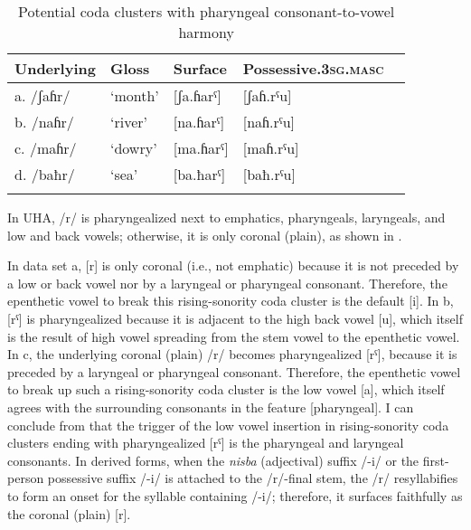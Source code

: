 \documentclass[output=paper,colorlinks,citecolor=brown]{langscibook}
\begin{document}
\begin{table}
\caption{Potential coda clusters with pharyngeal consonant-to-vowel harmony}
\label{potC}
\begin{tabular}{lllll}
\lsptoprule
Underlying & Gloss & Surface & Possessive.3\textsc{sg}.\textsc{masc} \\\midrule 
a. /ʃaɦr/   &   ‘month’ &   [ʃa.ɦarˤ]   &   [ʃaɦ.rˤu] \\
b. /naɦr/   &   ‘river’ &   [na.ɦarˤ]   &   [naɦ.rˤu] \\
c. /maɦr/   &   ‘dowry’ &   [ma.ɦarˤ]   &   [maɦ.rˤu] \\
d. /baħr/   &   ‘sea’   &   [ba.ħarˤ]   &   [baħ.rˤu]\\
\lspbottomrule                
\end{tabular}
\end{table}

In UHA, /r/ is pharyngealized next to emphatics, pharyngeals, laryngeals, and low and back vowels; otherwise, it is only coronal (plain), as shown in .


\begin{table}
\caption{Potential coda clusters with plain [r] and pharyngealized [rˤ]}
\label{potcc}
\end{table}


In data set a, [r] is only coronal (i.e., not emphatic) because it is not preceded by a low or back vowel nor by a laryngeal or pharyngeal consonant. Therefore, the epenthetic vowel to break this rising-sonority coda cluster is the default [i]. In b, [rˤ] is pharyngealized because it is adjacent to the high back vowel [u], which itself is the result of high vowel spreading from the stem vowel to the epenthetic vowel. In c, the underlying coronal (plain) /r/ becomes pharyngealized [rˤ], because it is preceded by a laryngeal or pharyngeal consonant. Therefore, the epenthetic vowel to break up such a rising-sonority coda cluster is the low vowel [a], which itself agrees with the surrounding consonants in the feature [pharyngeal]. I can conclude from  that the trigger of the low vowel insertion in rising-sonority coda clusters ending with pharyngealized [rˤ] is the pharyngeal and laryngeal consonants. In derived forms, when the \textit{nisba} (adjectival) suffix /-i/ or the first-person possessive suffix /-i/ is  attached to the /r/-final stem, the /r/ resyllabifies to form an onset for the syllable containing /-i/; therefore, it surfaces faithfully as the coronal (plain) [r].
\end{document}
